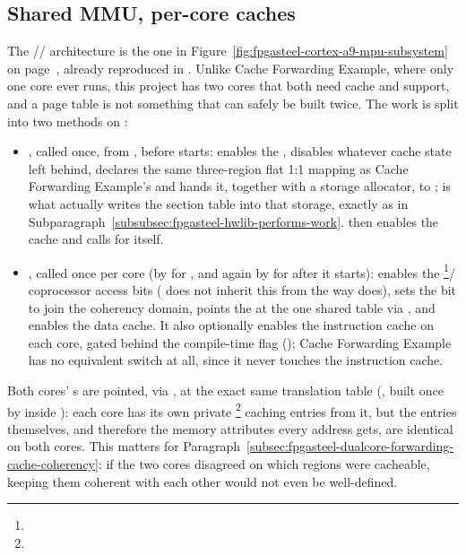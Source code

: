 \subsection{Shared MMU, per-core caches}
\label{subsec:fpgasteel-dualcore-forwarding-shared-mmu}

The // architecture is the one in Figure~\ref{fig:fpgasteel-cortex-a9-mpu-subsystem} on page~\pageref{fig:fpgasteel-cortex-a9-mpu-subsystem}, already reproduced in . Unlike Cache Forwarding Example, where only one core ever runs, this project has two cores that both need cache and  support, and a page table is not something that can safely be built twice. The work is split into two methods on :

\begin{itemize}
 \item {}, called once, from , before  starts: enables the , disables whatever cache state  left behind, declares the same three-region flat 1:1 mapping as Cache Forwarding Example's  and hands it, together with a storage allocator, to ;  is what actually writes the section table into that storage, exactly as in Subparagraph~\ref{subsubsec:fpgasteel-hwlib-performs-work}.  then enables the  cache and calls  for  itself.
 \item {}, called once per core (by  for , and again by  for  after it starts): enables the \footnote{}/ coprocessor access bits ( does not inherit this from  the way  does), sets the  bit to join the  coherency domain, points the  at the one shared table via , and enables the  data cache. It also optionally enables the  instruction cache on each core, gated behind the  compile-time flag (); Cache Forwarding Example has no equivalent switch at all, since it never touches the instruction cache.
\end{itemize}

Both cores' s are pointed, via , at the exact same translation table (, built once by  inside ): each core has its own private \footnote{} caching entries from it, but the entries themselves, and therefore the memory attributes every address gets, are identical on both cores. This matters for Paragraph~\ref{subsec:fpgasteel-dualcore-forwarding-cache-coherency}: if the two cores disagreed on which regions were cacheable, keeping them coherent with each other would not even be well-defined.

